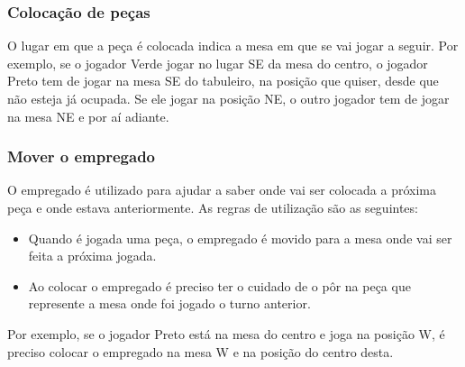 \documentclass[a4paper]{article}
\begin{document}
\subsubsection{Colocação de peças}
O lugar em que a peça é colocada indica a mesa em que se vai jogar a seguir. Por exemplo, se o jogador Verde jogar no lugar SE da mesa do centro, o jogador Preto tem de jogar na mesa SE do tabuleiro, na posição que quiser, desde que não esteja já ocupada. Se ele jogar na posição NE, o outro jogador tem de jogar na mesa NE e por aí adiante.

\subsubsection{Mover o empregado}
O empregado é utilizado para ajudar a saber onde vai ser colocada a próxima peça e onde estava anteriormente. As regras de utilização são as seguintes:
\begin{itemize}
\item Quando é jogada uma peça, o empregado é movido para a mesa onde vai ser feita a próxima jogada.
\item Ao colocar o empregado é preciso ter o cuidado de o pôr na peça que represente a mesa onde foi jogado o turno anterior.
\end{itemize}
Por exemplo, se o jogador Preto está na mesa do centro e joga na posição W, é preciso colocar o empregado na mesa W e na posição do centro desta.
\end{document}

